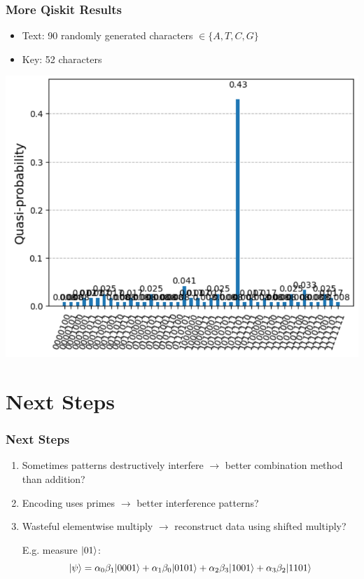 \documentclass[
	11pt, %
]{beamer}
\begin{document}

\begin{frame}
    \frametitle{More Qiskit Results}
    \begin{itemize}
        \item Text: 90 randomly generated characters $\in \{A,T,C,G\}$
        \item Key: 52 characters
    \end{itemize}

    \begin{center}
        \includegraphics[scale=0.5]{aer_stress_test.png}
    \end{center}
\end{frame}


\section{Next Steps}
\begin{frame}
    \frametitle{Next Steps}
    \begin{enumerate}
        \item Sometimes patterns destructively interfere $\longrightarrow$ better combination method than addition?
        \item Encoding uses primes $\longrightarrow$ better interference patterns?
        \item Wasteful elementwise multiply $\longrightarrow$ reconstruct data using shifted multiply?
        
        \bigskip
        E.g. measure $\rvert01\rangle$:
        \[
            \rvert\psi\rangle = \alpha_0\beta_1 \rvert0001\rangle + \alpha_1\beta_0 \rvert0101\rangle + \alpha_2\beta_3 \rvert1001\rangle + \alpha_3\beta_2 \rvert1101\rangle
        \]
    \end{enumerate}
\end{frame}
\end{document}
